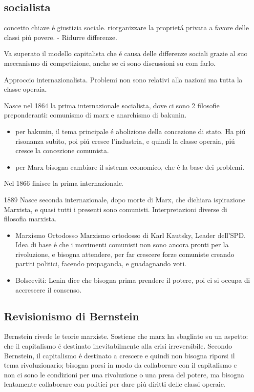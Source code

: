 \documentclass{article}
\begin{document}
\subsection{socialista}

concetto chiave é giustizia sociale. riorganizzare la proprietá privata a favore delle classi piú povere. - Ridurre differenze.

Va superato il modello capitalista che é causa delle differenze sociali grazie al suo meccanismo di competizione, anche se ci sono discussioni su com farlo.

Approccio internazionalista. Problemi non sono relativi alla nazioni ma tutta la classe operaia.

Nasce nel 1864 la prima internazionale socialista, dove ci sono 2 filosofie preponderanti: comunismo di marx e anarchismo di bakunin.
\begin{itemize}
\item per bakunin, il tema principale é abolizione della concezione di stato. Ha piú risonanza subito, poi piú cresce l'industria, e quindi la classe operaia, piú cresce la concezione comunista.

\item per Marx bisogna cambiare il sistema economico, che é la base dei problemi.
\end{itemize}
Nel 1866 finisce la prima internazionale.

1889 Nasce seconda internazionale, dopo morte di Marx, che dichiara ispirazione Marxista, e quasi tutti i presenti sono comunisti. Interpretazioni diverse di filosofia marxista.
\begin{itemize}
\item Marxismo Ortodosso
Marxismo ortodosso di Karl Kautsky, Leader dell'SPD. Idea di base é che i movimenti comunisti non sono ancora pronti per la rivoluzione, e bisogna attendere, per far crescere forze comuniste creando partiti politici, facendo propaganda, e guadagnando voti.

\item Bolsceviti: Lenin dice che bisogna prima prendere il potere, poi ci si occupa di accrescere il consenso.
\end{itemize}
\subsection{Revisionismo di Bernstein}
Bernstein rivede le teorie marxiste. Sostiene che marx ha sbagliato su un aspetto: che il capitalismo é destinato inevitabilmente alla crisi irreversibile. Secondo Bernstein, il capitalismo é destinato a crescere e quindi non bisogna riporsi il tema rivoluzionario; bisogna porsi in modo da collaborare con il capitalismo e non ci sono le condizioni per una rivoluzione o una presa del potere, ma bisogna lentamente collaborare con politici per dare piú diritti delle classi operaie.
\end{document}
